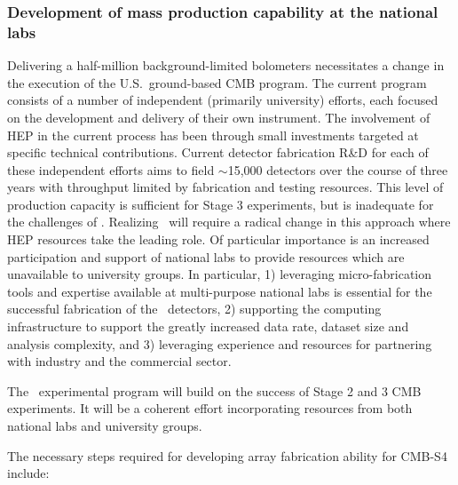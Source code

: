 \subsubsection{Development of mass production capability at the national labs}

Delivering a half-million background-limited bolometers necessitates a
change in the execution of the U.S.\ ground-based CMB program. The
current program consists of a number of independent (primarily
university) efforts, each focused on the development and delivery of
their own instrument. The involvement of HEP in the current process
has been through small investments targeted at specific technical
contributions. 
Current detector fabrication R\&D for each of these independent efforts aims to field $\sim$15,000 detectors over the course of three years with throughput limited by fabrication and testing resources. This level of production capacity is sufficient for Stage 3 experiments, but is inadequate for the challenges of \cmbexp. 
Realizing \cmbexp\ will require a radical change in
this approach where HEP resources take the leading role. Of particular
importance is an increased participation and support of national labs
to provide resources which are unavailable to university groups. In
particular, 1) leveraging micro-fabrication tools and expertise
available at multi-purpose national labs is essential for the
successful fabrication of the \cmbexp\ detectors, 2) supporting
the computing infrastructure to support the greatly increased data
rate, dataset size and analysis complexity, 
and 3) leveraging experience and resources for partnering with industry and the commercial sector.

The \cmbexp\ experimental program will build on the success of Stage
2 and 3 CMB experiments.  It will be a coherent effort
incorporating resources from both national labs and university groups.

The necessary steps required for developing array fabrication ability
for CMB-S4 include:

